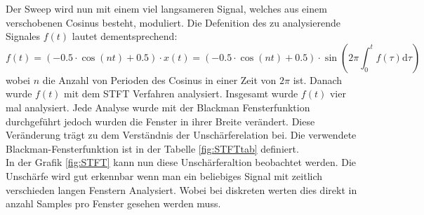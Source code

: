 Der Sweep wird nun mit einem viel langsameren Signal, welches aus einem verschobenen Cosinus besteht, moduliert. Die Defenition des zu analysierende Signales $f(t)$ lautet dementsprechend:
\begin{equation}
f(t)= (-0.5\cdot \cos(nt)+0.5)\cdot x(t)=(-0.5\cdot \cos(nt)+0.5)\cdot \sin \left(2 \pi \int_{0}^{t} f(\tau) \mathrm{d} \tau\right)
\end{equation} \label{eq:sin-sweep}
wobei $n$ die Anzahl von Perioden des Cosinus in einer Zeit von $2\pi$ ist. Danach wurde $f(t)$ mit dem STFT Verfahren analysiert. Insgesamt wurde $f(t)$ vier mal analysiert. Jede Analyse wurde mit der Blackman Fensterfunktion durchgeführt jedoch wurden die Fenster in ihrer Breite verändert. Diese Veränderung trägt zu dem Verständnis der Unschärferelation bei. Die verwendete Blackman-Fensterfunktion ist in der Tabelle \ref{fig:STFTtab} definiert.\\

In der Grafik \ref{fig:STFT} kann nun diese Unschärferaltion beobachtet werden. Die Unschärfe wird gut erkennbar wenn man ein beliebiges Signal mit zeitlich verschieden langen Fenstern Analysiert. Wobei bei diskreten werten dies direkt in anzahl Samples pro Fenster gesehen werden muss.\\



